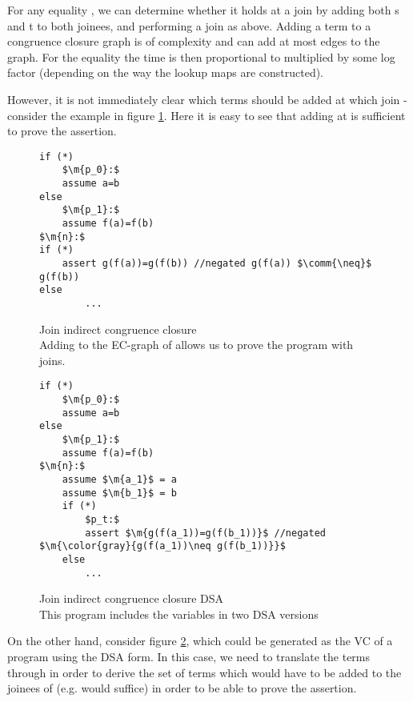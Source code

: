 For any equality , we can determine whether it holds at a join by adding both s and t to both joinees, and performing a join as above. Adding a term  to a congruence closure graph is of complexity  and can add at most  edges to the graph.
For the equality  the time is then proportional to  multiplied by some log factor (depending on the way the lookup maps are constructed).

However, it is not immediately clear which terms should be added at which join - consider the example in figure \ref{snippet3.7}.
Here it is easy to see that adding  at  is sufficient to prove the assertion.

\begin{figure}
\begin{lstlisting}
if (*)
	$\m{p_0}:$
	assume a=b
else
	$\m{p_1}:$
	assume f(a)=f(b)
$\m{n}:$
if (*)
	assert g(f(a))=g(f(b)) //negated g(f(a)) $\comm{\neq}$ g(f(b))
else
		...
\end{lstlisting}
\caption{Join indirect congruence closure\\
Adding  to the EC-graph of  allows us to prove the program with joins.
}
\label{snippet3.7}
\end{figure}

\begin{figure}
\begin{lstlisting}
if (*)
	$\m{p_0}:$
	assume a=b
else
	$\m{p_1}:$
	assume f(a)=f(b)
$\m{n}:$
	assume $\m{a_1}$ = a
	assume $\m{b_1}$ = b
	if (*)
		$p_t:$
		assert $\m{g(f(a_1))=g(f(b_1))}$ //negated $\m{\color{gray}{g(f(a_1))\neq g(f(b_1))}}$
	else
		...
\end{lstlisting}
\caption{Join indirect congruence closure DSA\\
This program includes the variables  in two DSA versions}
\label{snippet3.8}
\end{figure}

On the other hand, consider figure \ref{snippet3.8}, which could be generated as the VC of a program using the DSA form.
In this case, we need to translate the terms  through  in order to derive the set of terms which would have to be added to the joinees of  
(e.g.  would suffice) in order to be able to prove the assertion.

